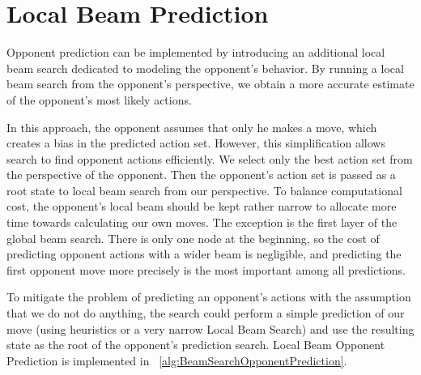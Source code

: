 \documentclass[shortabstract, mgr, english]{iithesis}
\begin{document}
\section{Local Beam Prediction}
\label{sec:LocalBeamPrediction}
Opponent prediction can be implemented by introducing an additional local beam search dedicated to modeling the opponent's behavior. By running a local beam search from the opponent's perspective, we obtain a more accurate estimate of the opponent's most likely actions.

In this approach, the opponent assumes that only he makes a move, which creates a bias in the predicted action set. However, this simplification allows search to find opponent actions efficiently. We select only the best action set from the perspective of the opponent. Then the opponent's action set is passed as a root state to local beam search from our perspective. To balance computational cost, the opponent's local beam should be kept rather narrow to allocate more time towards calculating our own moves. The exception is the first layer of the global beam search. There is only one node at the beginning, so the cost of predicting opponent actions with a wider beam is negligible, and predicting the first opponent move more precisely is the most important among all predictions.

To mitigate the problem of predicting an opponent's actions with the assumption that we do not do anything, the search could perform a simple prediction of our move (using heuristics or a very narrow Local Beam Search) and use the resulting state as the root of the opponent's prediction search.
Local Beam Opponent Prediction is implemented in ~\ref{alg:BeamSearchOpponentPrediction}.
\end{document}
